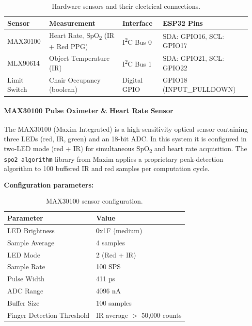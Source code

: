 \documentclass[12pt,a4paper]{report}
\begin{document}
\begin{table}[H]
\centering
\caption{Hardware sensors and their electrical connections.}
\label{tab:sensors}
\begin{tabular}{@{}llll@{}}
\toprule
\textbf{Sensor} & \textbf{Measurement} & \textbf{Interface} & \textbf{ESP32 Pins} \\
\midrule
MAX30100 & Heart Rate, SpO\textsubscript{2} (IR + Red PPG) & I\textsuperscript{2}C Bus 0 & SDA: GPIO16, SCL: GPIO17 \\
MLX90614 & Object Temperature (IR)    & I\textsuperscript{2}C Bus 1 & SDA: GPIO21, SCL: GPIO22 \\
Limit Switch & Chair Occupancy (boolean) & Digital GPIO              & GPIO18 (INPUT\_PULLDOWN) \\
\bottomrule
\end{tabular}
\end{table}

\paragraph{MAX30100 Pulse Oximeter \& Heart Rate Sensor}

The MAX30100 (Maxim Integrated) is a high-sensitivity optical sensor containing three LEDs
(red, IR, green) and an 18-bit ADC. In this system it is configured in two-LED mode
(red + IR) for simultaneous SpO\textsubscript{2} and heart rate acquisition. The
\texttt{spo2\_algorithm} library from Maxim applies a proprietary peak-detection algorithm
to 100 buffered IR and red samples per computation cycle.

\textbf{Configuration parameters:}

\begin{table}[H]
\centering
\caption{MAX30100 sensor configuration.}
\begin{tabular}{@{}ll@{}}
\toprule
\textbf{Parameter}     & \textbf{Value} \\
\midrule
LED Brightness         & 0x1F (medium) \\
Sample Average         & 4 samples \\
LED Mode               & 2 (Red + IR) \\
Sample Rate            & 100 SPS \\
Pulse Width            & 411 µs \\
ADC Range              & 4096 nA \\
Buffer Size            & 100 samples \\
Finger Detection Threshold & IR average $>$ 50,000 counts \\
\bottomrule
\end{tabular}
\end{table}
\end{document}
